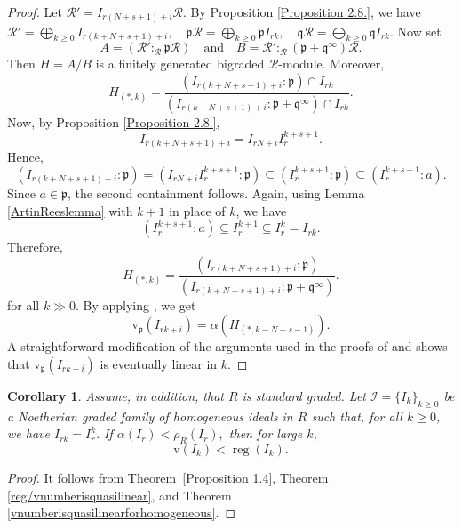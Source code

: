 \documentclass[11pt,reqno,a4paper]{amsart}
\newtheorem{corollary}[theorem]{Corollary}
\theoremstyle{definition}
\begin{document}
\begin{proof}
\noindent Let \(\mathcal{R}' = I_{r(N+s+1)+i} \mathcal{R}\). By Proposition \ref{Proposition 2.8.}, we have  
\( 
\mathcal{R}' = \bigoplus_{k \geq 0} I_{r(k+N+s+1)+i}, \quad  
\mathfrak{p} \mathcal{R} = \bigoplus_{k \geq 0} \mathfrak{p} I_{rk}, \quad  
\mathfrak{q} \mathcal{R} = \bigoplus_{k \geq 0} \mathfrak{q} I_{rk}. 
\) 
Now set 
\[ 
A = (\mathcal{R}' :_{\mathcal{R}} \mathfrak{p} \mathcal{R}) \quad \text{and} \quad  
B = \mathcal{R}' :_{\mathcal{R}} (\mathfrak{p} + \mathfrak{q}^{\infty}) \mathcal{R}. 
\] 
Then \(H = A / B\) is a finitely generated bigraded \(\mathcal{R}\)-module. Moreover,
\[ 
H_{(*,k)} = \frac{(I_{r(k+N+s+1)+i} : \mathfrak{p}) \cap I_{rk}}{(I_{r(k+N+s+1)+i} : \mathfrak{p} + \mathfrak{q}^{\infty}) \cap I_{rk}}. 
\] 
Now, by Proposition \ref{Proposition 2.8.},
\[
I_{r(k+N+s+1)+i}=I_{rN+i}I_r^{k+s+1}.
\]
Hence,
\[
(I_{r(k+N+s+1)+i}:\mathfrak{p})=(I_{rN+i}I_r^{k+s+1}:\mathfrak{p})\subseteq (I_r^{k+s+1}:\mathfrak{p})\subseteq (I_r^{k+s+1}:a).
\]
Since $a\in\mathfrak{p}$, the second containment follows. Again, using Lemma \ref{ArtinReeslemma} with $k+1$ in place of $k$, we have
\[
(I_r^{k+s+1}:a)\subseteq I_r^{k+1}\subseteq I_r^k=I_{rk}.
\]
Therefore,
\[ 
H_{(*,k)} = \frac{(I_{r(k+N+s+1)+i} : \mathfrak{p})}{(I_{r(k+N+s+1)+i} : \mathfrak{p} + \mathfrak{q}^{\infty})}. 
\] 
for all \(k \gg 0\). By applying \cite[Lemma 1.2]{Conca24}, we get 
\[ 
\mathrm{v}_{\mathfrak{p}}(I_{rk+i}) = \alpha(H_{(*,k-N-s-1)}). 
\] 
A straightforward modification of the arguments used in the proofs of \cite[Lemma 3.3]{BrunsConcaVarbaro} and \cite[Theorem 8.3.4]{BrunsConcaRaicuVarbaro2022} shows that \(\mathrm{v}_{\mathfrak{p}}(I_{rk+i})\) is eventually linear in \(k\). 

\end{proof}
 

\begin{corollary}\label{v(Ik)<reg(Ik)forhomogeneousideals}Assume, in addition, that $R$ is standard graded.
Let $\mathcal{I}=\{I_k\}_{k\geq 0}$ be a Noetherian graded family of homogeneous ideals in  $R$ such that, for all $k\geq 0$, we have
\(
I_{rk}=I_r^k.
\)
If
\(
\alpha(I_r)<\rho_R(I_r),
\)
then for large $k$,
\[
\mathrm{v}(I_k)<\operatorname{reg}(I_k).
\]
\end{corollary}

\begin{proof}
It follows from Theorem~\ref{Proposition 1.4}, Theorem \ref{reg/vnumberisquasilinear}, and Theorem \ref{vnumberisquasilinearforhomogeneous}.
\end{proof}
\end{document}

